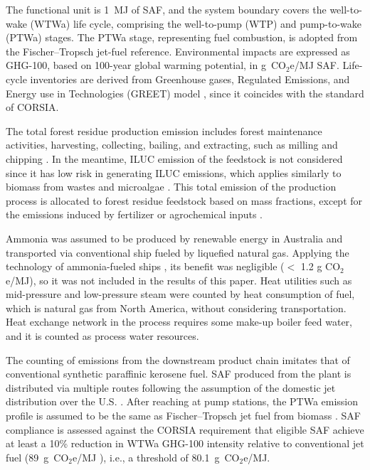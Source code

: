 The functional unit is 1~MJ of SAF, and the system boundary covers the well-to-wake (WTWa) life cycle, comprising the well-to-pump (WTP) and pump-to-wake (PTWa) stages. The PTWa stage, representing fuel combustion, is adopted from the Fischer--Tropsch jet-fuel reference. Environmental impacts are expressed as GHG-100, based on 100-year global warming potential, in g~CO$_2$e/MJ SAF. Life-cycle inventories are derived from Greenhouse gases, Regulated Emissions, and Energy use in Technologies (GREET) model \citep{wang2023greet}, since it coincides with the standard of CORSIA. 

The total forest residue production emission includes forest maintenance activities, harvesting, collecting, bailing, and extracting, such as milling and chipping \citep{han2011well}.
In the meantime, ILUC emission of the feedstock is not considered since it has low risk in generating ILUC emissions, which applies similarly to biomass from wastes and microalgae \cite{ICAO2023CORSIA}.
This total emission of the production process is allocated to forest residue feedstock based on mass fractions, except for the emissions induced by fertilizer or agrochemical inputs \citep{han2011well}. 

Ammonia was assumed to be produced by renewable energy in Australia \citep{lee2022techno} and transported via conventional ship fueled by liquefied natural gas. Applying the technology of ammonia-fueled ships \citep{schwarzkopf2023future}, its benefit was negligible ($<$ 1.2 g CO$_2$e/MJ), so it was not included in the results of this paper.
Heat utilities such as mid-pressure and low-pressure steam were counted by heat consumption of fuel, which is natural gas from North America, without considering transportation. 
Heat exchange network in the process requires some make-up boiler feed water, and it is counted as process water resources. 

The counting of emissions from the downstream product chain imitates that of conventional synthetic paraffinic kerosene fuel. 
SAF produced from the plant is distributed via multiple routes following the assumption of the domestic jet distribution over the U.S. \citep{xie2011assessment}.
After reaching at pump stations, the PTWa emission profile is assumed to be the same as Fischer--Tropsch jet fuel from biomass \citep{elgowainy2012life}.
SAF compliance is assessed against the CORSIA requirement that eligible SAF achieve at least a 10\% reduction in WTWa GHG-100 intensity \citep{ICAO2025SustCriteria} relative to conventional jet fuel (89~g~CO$_2$e/MJ \citep{ICAO2025Methodology}), i.e., a threshold of 80.1~g~CO$_2$e/MJ.

